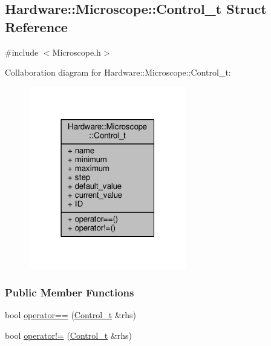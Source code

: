 \hypertarget{struct_hardware_1_1_microscope_1_1_control__t}{}\subsection{Hardware\+:\+:Microscope\+:\+:Control\+\_\+t Struct Reference}
\label{struct_hardware_1_1_microscope_1_1_control__t}


{\ttfamily \#include $<$Microscope.\+h$>$}



Collaboration diagram for Hardware\+:\+:Microscope\+:\+:Control\+\_\+t\+:
\nopagebreak
\begin{figure}[H]
\begin{center}
\leavevmode
\includegraphics[width=195pt]{struct_hardware_1_1_microscope_1_1_control__t__coll__graph}
\end{center}
\end{figure}
\subsubsection*{Public Member Functions}
\begin{DoxyCompactItemize}
\item 
bool \hyperlink{struct_hardware_1_1_microscope_1_1_control__t_ac0d0495a006e660371bb79efec65c985}{operator==} (\hyperlink{struct_hardware_1_1_microscope_1_1_control__t}{Control\+\_\+t} \&rhs)
\item 
bool \hyperlink{struct_hardware_1_1_microscope_1_1_control__t_a7bc64551eaa1568673551e780661121a}{operator!=} (\hyperlink{struct_hardware_1_1_microscope_1_1_control__t}{Control\+\_\+t} \&rhs)
\end{DoxyCompactItemize}
